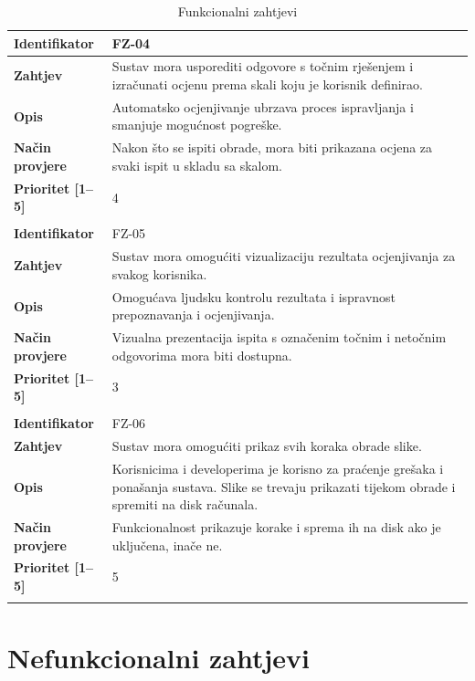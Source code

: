 \documentclass{foi}
\begin{document}
\begin{longtable}{|l|p{12cm}|}
    \textbf{Identifikator} & FZ-04 \\ \hline
    \textbf{Zahtjev} & Sustav mora usporediti odgovore s točnim rješenjem i izračunati ocjenu prema skali koju je korisnik definirao. \\ \hline
    \textbf{Opis} & Automatsko ocjenjivanje ubrzava proces ispravljanja i smanjuje mogućnost pogreške. \\ \hline
    \textbf{Način provjere} & Nakon što se ispiti obrade, mora biti prikazana ocjena za svaki ispit u skladu sa skalom. \\ \hline
    \textbf{Prioritet [1--5]} & 4 \\ \hline
    \multicolumn{2}{|c|}{} \\ \hline
    \pagebreak
    \hline

    \textbf{Identifikator} & FZ-05 \\ \hline
    \textbf{Zahtjev} & Sustav mora omogućiti vizualizaciju rezultata ocjenjivanja za svakog korisnika. \\ \hline
    \textbf{Opis} & Omogućava ljudsku kontrolu rezultata i ispravnost prepoznavanja i ocjenjivanja. \\ \hline
    \textbf{Način provjere} & Vizualna prezentacija ispita s označenim točnim i netočnim odgovorima mora biti dostupna. \\ \hline
    \textbf{Prioritet [1--5]} & 3 \\ \hline
    \multicolumn{2}{|c|}{} \\ \hline
    
    \textbf{Identifikator} & FZ-06 \\ \hline
    \textbf{Zahtjev} & Sustav mora omogućiti prikaz svih koraka obrade slike. \\ \hline
    \textbf{Opis} & Korisnicima i developerima je korisno za praćenje grešaka i ponašanja sustava. Slike se trevaju prikazati tijekom obrade i spremiti na disk računala. \\ \hline
    \textbf{Način provjere} & Funkcionalnost prikazuje korake i sprema ih na disk ako je uključena, inače ne. \\ \hline
    \textbf{Prioritet [1--5]} & 5  \\ \hline
        
    \caption{Funkcionalni zahtjevi}
\end{longtable}

\section{Nefunkcionalni zahtjevi}
\end{document}
